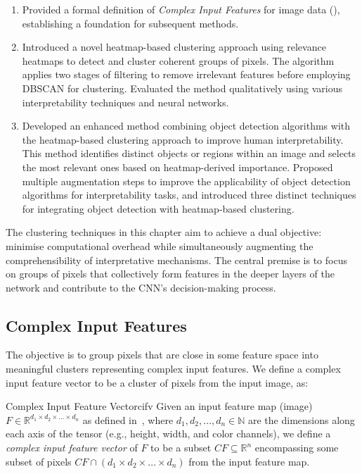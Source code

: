 \begin{enumerate} 
\item Provided a formal definition of \emph{Complex Input Features} for image data (), establishing a foundation for subsequent methods.

\item Introduced a novel heatmap-based clustering approach using relevance heatmaps to detect and cluster coherent groups of pixels. The algorithm applies two stages of filtering to remove irrelevant features before employing DBSCAN for clustering. Evaluated the method qualitatively using various interpretability techniques and neural networks.

\item Developed an enhanced method combining object detection algorithms with the heatmap-based clustering approach to improve human interpretability. This method identifies distinct objects or regions within an image and selects the most relevant ones based on heatmap-derived importance. Proposed multiple augmentation steps to improve the applicability of object detection algorithms for interpretability tasks, and introduced three distinct techniques for integrating object detection with heatmap-based clustering. 
\end{enumerate}

The clustering techniques in this chapter aim to achieve a dual objective: minimise computational overhead while simultaneously augmenting the comprehensibility of interpretative mechanisms. The central premise is to focus on groups of pixels that collectively form features in the deeper layers of the network and contribute to the CNN's decision-making process.

\subsection{Complex Input Features}

The objective is to group pixels that are close in some feature space into meaningful clusters representing complex input features. We define a complex input feature vector to be a cluster of pixels from the input image, as:

\begin{Definition}{Complex Input Feature Vector}{cifv}
Given an input feature map (image) $F \in \mathbb{R}^{d_1 \times d_2 \times \ldots \times d_n}$ as defined in~, where $d_1, d_2, \ldots, d_n \in \mathbb{N}$ are the dimensions along each axis of the tensor (e.g., height, width, and color channels), we define a \emph{complex input feature vector} of $F$ to be a subset $CF \subseteq \mathbb{R}^n$ encompassing some subset of pixels $CF \cap (d_1 \times d_2 \times \ldots \times d_n)$ from the input feature map.
\end{Definition}

